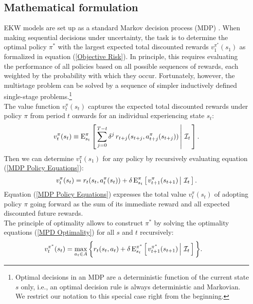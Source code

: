 \subsection{Mathematical formulation}\label{Mathematics}
EKW models are set up as a standard Markov decision process (MDP) \citep{Puterman.1994, White.1993}. When making sequential decisions under uncertainty, the task is to determine the optimal policy $\pi^*$ with the largest expected total discounted rewards $v^{\pi^*}_1(s_1)$ as formalized in equation (\ref{Objective Risk}). In principle, this requires evaluating the performance of all policies based on all possible sequences of rewards, each weighted by the probability with which they occur. Fortunately, however, the multistage problem can be solved by a sequence of simpler inductively defined single-stage problems.\footnote{Optimal decisions in an MDP are a deterministic function of the current state $s$ only, i.e., an optimal decision rule is always deterministic and Markovian. We restrict our notation to this special case right from the beginning.}\\

\noindent The value function $v^\pi_t(s_t)$ captures the expected total discounted rewards under policy $\pi$ from period $t$ onwards for an individual experiencing state $s_t$:
%
\begin{align*}
  v^\pi_t(s_t) \equiv \mathrm{E}_{s_t}^\pi\left[\left.\sum^{T - t}_{j = 0}  \delta^j\, r_{t + j}(s_{t + j}, a^\pi_{t + j}(s_{t + j})) \,\right\vert\,\mathcal{I}_t\,\right].
\end{align*}
%
Then we can determine $v_1^\pi(s_1)$ for any policy by recursively evaluating equation (\ref{MDP Policy Equations}):
%
\begin{align}\label{MDP Policy Equations}
v^\pi_t(s_t) = r_t(s_t,  a^\pi_t(s_t)) + \delta\,\mathrm{E}^\pi_{s_t} \left[\left.v^\pi_{t + 1}(s_{t + 1})  \,\right\vert\,\mathcal{I}_t\,\right].
\end{align}
%
Equation (\ref{MDP Policy Equations}) expresses the total value $v^\pi_t(s_t)$ of adopting policy $\pi$ going forward as the sum of its immediate reward and all expected discounted future rewards.\\

\noindent The principle of optimality \citep{Bellman.1954} allows to construct $\pi^*$ by solving the optimality equations (\ref{MPD Optimality})  for all $s$ and $t$ recursively:
%
\begin{align}\label{MPD Optimality}
v^{\pi^*}_t(s_t)  & = \max_{a_t \in A}\bigg\{ r_t(s_t, a_t) + \delta\, \mathrm{E}^{\pi^*}_{s_t} \left[\left.v^{\pi^*}_{t + 1}(s_{t + 1})\,\right\vert\,\mathcal{I}_t\,\right] \bigg\}.
\end{align}

